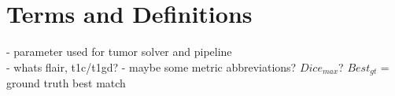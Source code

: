 
\chapter{Terms and Definitions}\label{chapter:terms_and_definitions}

- parameter used for tumor solver and pipeline\\
- whats flair, t1c/t1gd? 
- maybe some metric abbreviations? $Dice_{max}$? $Best_{gt}$ = ground truth best match







